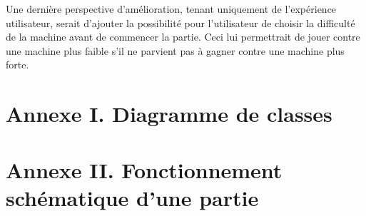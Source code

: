       Une dernière perspective d'amélioration, tenant uniquement de l'expérience utilisateur, serait d'ajouter la possibilité pour l'utilisateur de choisir la difficulté de la machine avant de commencer la partie.
      Ceci lui permettrait de jouer contre une machine plus faible s'il ne parvient pas à gagner contre une machine plus forte.

\newpage

\section*{Annexe I. Diagramme de classes}

\newpage

\section*{Annexe II. Fonctionnement schématique d'une partie}
